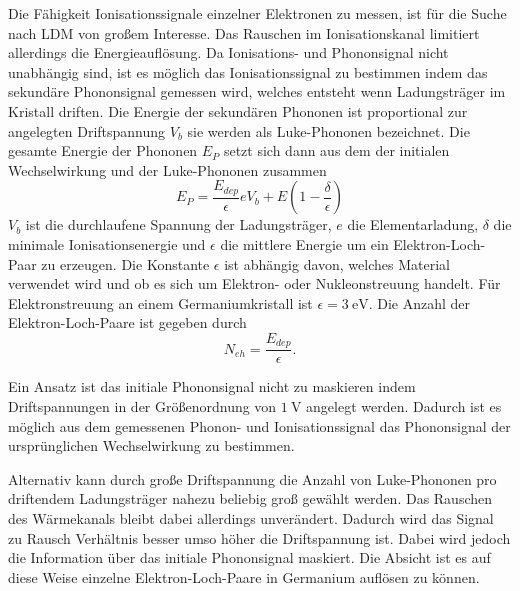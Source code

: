 Die Fähigkeit Ionisationssignale einzelner Elektronen zu messen, ist für die Suche nach LDM von großem Interesse.
Das Rauschen im Ionisationskanal limitiert allerdings die Energieauflösung.
Da Ionisations- und Phononsignal nicht unabhängig sind, ist es möglich das Ionisationssignal zu bestimmen indem das sekundäre Phononsignal gemessen wird, welches entsteht wenn Ladungsträger im Kristall driften.
Die Energie der sekundären Phononen ist proportional zur angelegten Driftspannung $V_b$ sie werden als Luke-Phononen bezeichnet.
Die gesamte Energie der Phononen $E_P$ setzt sich dann aus dem der initialen Wechselwirkung und der Luke-Phononen zusammen
\begin{equation}
E_P = \frac{E_{dep}}{\epsilon}eV_b + E(1-\frac{\delta}{\epsilon})
\end{equation}
$V_b$ ist die durchlaufene Spannung der Ladungsträger, $e$ die Elementarladung, $\delta$ die minimale Ionisationsenergie und $\epsilon$ die mittlere Energie um ein Elektron-Loch-Paar zu erzeugen.
Die Konstante $\epsilon$ ist abhängig davon, welches Material verwendet wird und ob es sich um Elektron- oder Nukleonstreuung handelt.
Für Elektronstreuung an einem Germaniumkristall ist $\epsilon=\SI{3}{\electronvolt}$\cite{Luke1988}.
Die Anzahl der Elektron-Loch-Paare ist gegeben durch
\begin{equation}
N_{eh} = \frac{E_{dep}}{\epsilon}.
\end{equation}

Ein Ansatz ist das initiale Phononsignal nicht zu maskieren indem Driftspannungen in der Größenordnung von $\SI{1}{\volt}$ angelegt werden.
Dadurch ist es möglich aus dem gemessenen Phonon- und Ionisationssignal das Phononsignal der ursprünglichen Wechselwirkung zu bestimmen.

Alternativ kann durch große Driftspannung die Anzahl von Luke-Phononen pro driftendem Ladungsträger nahezu beliebig groß gewählt werden.
Das Rauschen des Wärmekanals bleibt dabei allerdings unverändert.
Dadurch wird das Signal zu Rausch Verhältnis besser umso höher die Driftspannung ist.
Dabei wird jedoch die Information über das initiale Phononsignal maskiert.
Die Absicht ist es auf diese Weise einzelne Elektron-Loch-Paare in Germanium auflösen zu können\cite{Mirabolfathi2015}.
